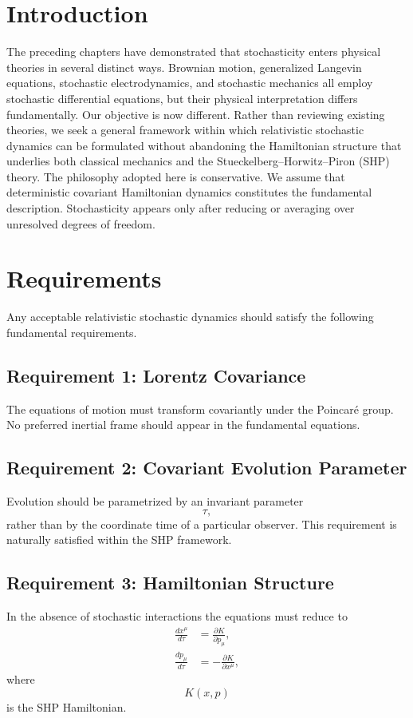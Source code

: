 \section{Introduction}
The preceding chapters have demonstrated that stochasticity enters
physical theories in several distinct ways. Brownian motion,
generalized Langevin equations, stochastic electrodynamics, and
stochastic mechanics all employ stochastic differential equations, but
their physical interpretation differs fundamentally.
Our objective is now different.
Rather than reviewing existing theories, we seek a general framework
within which relativistic stochastic dynamics can be formulated without
abandoning the Hamiltonian structure that underlies both classical
mechanics and the Stueckelberg--Horwitz--Piron (SHP) theory.
The philosophy adopted here is conservative.
We assume that deterministic covariant Hamiltonian dynamics constitutes
the fundamental description. Stochasticity appears only after reducing
or averaging over unresolved degrees of freedom.
\section{Requirements}
Any acceptable relativistic stochastic dynamics should satisfy the
following fundamental requirements.
\subsection*{Requirement 1: Lorentz Covariance}
The equations of motion must transform covariantly under the Poincaré
group.
No preferred inertial frame should appear in the fundamental equations.
\subsection*{Requirement 2: Covariant Evolution Parameter}
Evolution should be parametrized by an invariant parameter
\[\tau,\]
rather than by the coordinate time of a particular observer.
This requirement is naturally satisfied within the SHP framework.
\subsection*{Requirement 3: Hamiltonian Structure}
In the absence of stochastic interactions the equations must reduce to
\begin{align}
\frac{dx^\mu}{d\tau}&=\frac{\partial K}{\partial p_\mu},\\
\frac{dp_\mu}{d\tau}&=-\frac{\partial K}{\partial x^\mu},
\end{align}
where
\[K(x,p)\]
is the SHP Hamiltonian.
